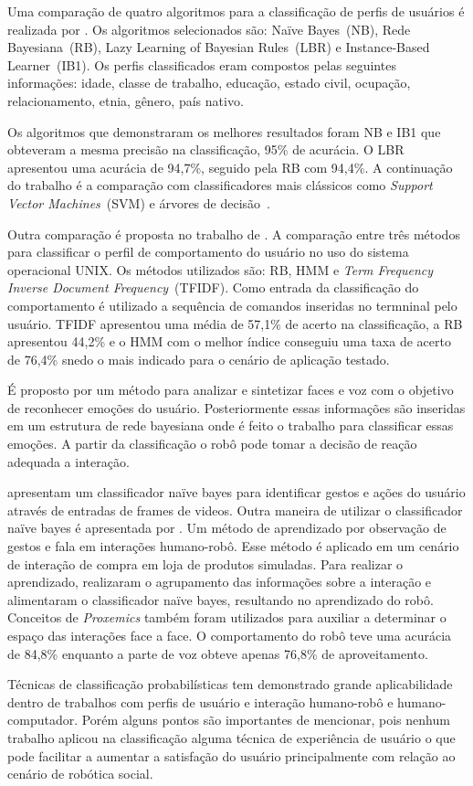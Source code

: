 Uma comparação de quatro algoritmos para a classificação de perfis de usuários é realizada por . Os algoritmos selecionados são: Naïve Bayes~(NB), Rede Bayesiana~(RB), Lazy Learning of Bayesian Rules~(LBR) e Instance-Based Learner~(IB1). Os perfis classificados eram compostos pelas seguintes informações: idade, classe de trabalho, educação, estado civil, ocupação, relacionamento, etnia, gênero, país nativo.

Os algoritmos que demonstraram os melhores resultados foram NB e IB1 que obteveram a mesma precisão na classificação, 95\% de acurácia. O LBR apresentou uma acurácia de 94,7\%, seguido pela RB com 94,4\%. A continuação do trabalho é a comparação com classificadores mais clássicos como \emph{Support Vector Machines}~(SVM) e árvores de decisão~\cite{cufoglu:2008}.

Outra comparação é proposta no trabalho de . A comparação entre três métodos para classificar o perfil de comportamento do usuário no uso do sistema operacional UNIX. Os métodos utilizados são: RB, HMM e \emph{Term Frequency Inverse Document Frequency}~(TFIDF). Como entrada da classificação do comportamento é utilizado a sequência de comandos inseridas no termninal pelo usuário. TFIDF apresentou uma média de 57,1\% de acerto na classificação, a RB apresentou 44,2\% e o HMM com o melhor índice conseguiu uma taxa de acerto de 76,4\% snedo o mais indicado para o cenário de aplicação testado.

É proposto por  um método para analizar e sintetizar faces e voz com o objetivo de reconhecer emoções do usuário. Posteriormente essas informações são inseridas em um estrutura de rede bayesiana onde é feito o trabalho para classificar essas emoções. A partir da classificação o robô pode tomar a decisão de reação adequada a interação.

 apresentam um classificador naïve bayes para identificar gestos e ações do usuário através de entradas de frames de videos. Outra maneira de utilizar o classificador naïve bayes é apresentada por . Um método de aprendizado por observação de gestos e fala em interações humano-robô. Esse método é aplicado em um cenário de interação de compra em loja de produtos simuladas. Para realizar o aprendizado,  realizaram o agrupamento das informações sobre a interação e alimentaram o classificador naïve bayes, resultando no aprendizado do robô. Conceitos de \emph{Proxemics} também foram utilizados para auxiliar a determinar o espaço das interações face a face. O comportamento do robô teve uma acurácia de 84,8\% enquanto a parte de voz obteve apenas 76,8\% de aproveitamento.

Técnicas de classificação probabilísticas tem demonstrado grande aplicabilidade dentro de trabalhos com perfis de usuário e interação humano-robô e humano-computador. Porém alguns pontos são importantes de mencionar, pois nenhum trabalho aplicou na classificação alguma técnica de experiência de usuário o que pode facilitar a aumentar a satisfação do usuário principalmente com relação ao cenário de robótica social.
